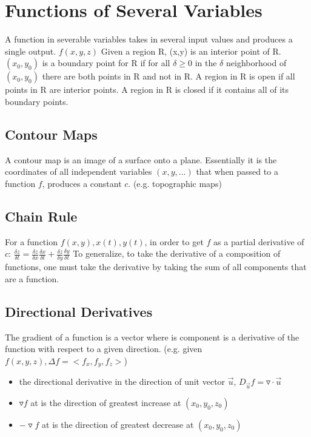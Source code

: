 \documentclass [12 pt, oneside] {book}
\begin{document}
\chapter{Functions of Several Variables}
A function in severable variables takes in several input values and produces a single output. $f(x,y,z)$
Given a region R, (x,y) is an interior point of R.
$(x_0,y_0)$ is a boundary point for R if for all $\delta \geq 0$ in the $\delta$ neighborhood of $(x_0,y_0)$ there are both points in R and not in R.
A region in R is open if all points in R are interior points.
A region in R is closed if it contains all of its boundary points. 

\section{Contour Maps}
A contour map is an image of a surface onto a plane. Essentially it is the coordinates of all independent variables $(x,y,...)$ that when passed to a function $f$, produces a constant $c$. (e.g. topographic maps)

\section{Chain Rule}
For a function $f(x,y),x(t),y(t)$, in order to get $f$ as a partial derivative of $c$:
$\frac{\delta z}{\delta t}=\frac{\delta z}{\delta x} \frac{\delta x}{\delta t}+\frac{\delta z}{\delta y} \frac{\delta y}{\delta t}$
To generalize, to take the derivative of a composition of functions, one must take the derivative by taking the sum of all components that are a function.

\section{Directional Derivatives}
The gradient of a function is a vector where is component is a derivative of the function with respect to a given direction. (e.g. given $f(x,y,z), \Delta f = <f_x,f_y,f_z>$)
\begin{itemize}
\item the directional derivative in the direction of unit vector $\vec{u}$, $D_{\vec{u}}f = \triangledown \cdot \vec{u}$
\item $\triangledown f$ at is the direction of greatest increase at $(x_0,y_0,z_0)$
\item $-\triangledown f$ at is the direction of greatest decrease at $(x_0,y_0,z_0)$
\end{itemize}
\end{document}
